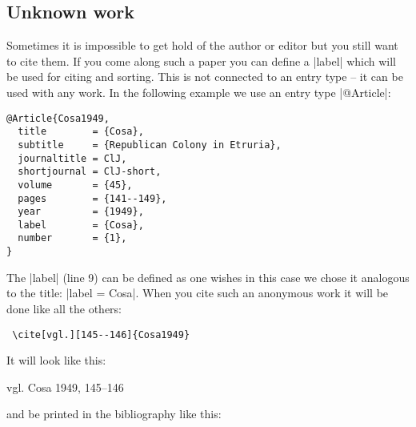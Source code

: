 \documentclass[a4paper,
10pt,
greek,
french,
spanish,
italian,
ngerman,
english
]{ltxdoc}
\begin{document}
\subsection{Unknown work}\label{unknown}
Sometimes it is impossible to get hold of the author or editor but you still want to cite them.
If you come along such a paper you can define a |label| which will be used for citing and sorting.
This is not connected to an entry type -- it can be used with any work.
In the following example we use an entry type |@Article|:
\begin{lstlisting}[style=bibentry,label=Cosa1949,caption={{@}Article\{Cosa1949,…\} }]
@Article{Cosa1949,
  title        = {Cosa},
  subtitle     = {Republican Colony in Etruria},
  journaltitle = ClJ,
  shortjournal = ClJ-short,
  volume       = {45},
  pages        = {141--149},
  year         = {1949},
  label        = {Cosa},
  number       = {1},
}
\end{lstlisting}
 The |label| (line 9) can be defined as one wishes in this case we chose it analogous to the title: |label = {Cosa}|.
When you cite such an anonymous work it will be done like all the others:
\begin{lstlisting}
 \cite[vgl.][145--146]{Cosa1949}
\end{lstlisting}
 It will look like this:
 \begin{bsp} 
 vgl. Cosa 1949, 145--146
 \end{bsp}
and be printed in the bibliography like this:
\end{document}
